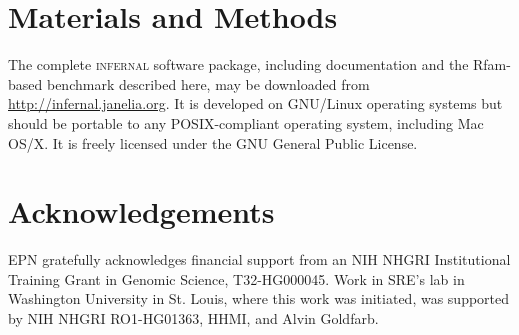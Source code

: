 \documentclass[11pt]{article}
\newif\ifdraft
\begin{document}
\section{Materials and Methods}

The complete \textsc{infernal} software package, including
documentation and the Rfam-based benchmark described here, may be
downloaded from \url{http://infernal.janelia.org}. It is developed on
GNU/Linux operating systems but should be portable to any
POSIX-compliant operating system, including Mac OS/X. It is freely
licensed under the GNU General Public License.

\section{Acknowledgements}

EPN gratefully acknowledges financial support from an NIH NHGRI
Institutional Training Grant in Genomic Science, T32-HG000045. Work in
SRE's lab in Washington University in St. Louis, where this work was
initiated, was supported by NIH NHGRI RO1-HG01363, HHMI, and Alvin
Goldfarb.


\newpage
%


\ifdraft
 \relax
\else

\newpage


\newpage


\newpage


\newpage


\newpage


\newpage


\newpage


\newpage


\newpage


\newpage


\newpage

\fi
\end{document}

